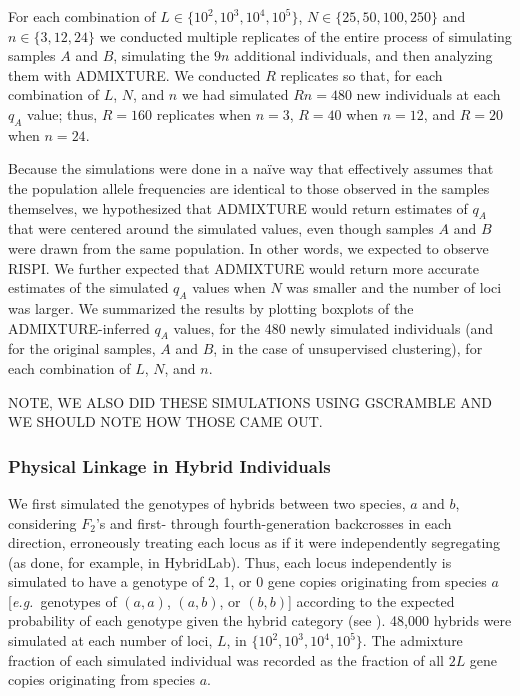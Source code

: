 For each combination of $L \in \{10^2, 10^3, 10^4, 10^5\}$,
$N \in \{25, 50, 100, 250\}$ and $n\in\{3,12,24\}$ we conducted multiple replicates
of the entire process of
simulating samples $A$ and $B$, simulating the $9n$ additional individuals, and
then analyzing them with ADMIXTURE.  We conducted $R$ replicates so that,
for each combination of $L$, $N$, and $n$ we had simulated $Rn=480$ new individuals
at each $q_A$ value; thus, $R=160$ replicates when $n = 3$, $R=40$ when $n=12$, and
$R=20$ when $n=24$.


Because the simulations were done in a na\"{i}ve way that effectively assumes that the population
allele frequencies are identical to those observed in the samples themselves, we hypothesized that ADMIXTURE would return estimates of
$q_A$ that were
centered around the simulated values, even though samples $A$ and $B$ were drawn from the same
population. In other words, we expected to observe RISPI.
We further expected that ADMIXTURE would return more accurate estimates of the simulated
$q_A$ values when $N$ was smaller and the number of loci was larger.
We summarized the results by plotting boxplots of the ADMIXTURE-inferred $q_A$ values,
 for the 480 newly simulated individuals (and for the original samples, $A$ and $B$, in the
 case of unsupervised clustering),
for each combination of $L$, $N$, and $n$.

NOTE, WE ALSO DID THESE SIMULATIONS USING GSCRAMBLE AND WE SHOULD NOTE
HOW THOSE CAME OUT.  

\subsubsection*{Physical Linkage in Hybrid Individuals}

We first simulated the genotypes of hybrids between two species, $a$ and $b$,
considering $F_2$'s and first- through
fourth-generation backcrosses in each direction, erroneously treating each
locus as if it were independently segregating (as done, for example, in {\sc HybridLab}). Thus,
each locus independently is simulated to have a genotype of 2, 1, or 0 gene copies originating from species $a$ [{\em e.g.}~genotypes of $(a,a)$, $(a,b)$, or $(b,b)$] according to the expected
probability of each genotype given the hybrid category (see \citealt{anderson2002model}).
48,000 hybrids were simulated at each number of loci, $L$, in $\{10^2, 10^3, 10^4, 10^5\}$.
The admixture fraction of each simulated individual was recorded as the fraction of all $2L$
gene copies originating from species $a$.  

